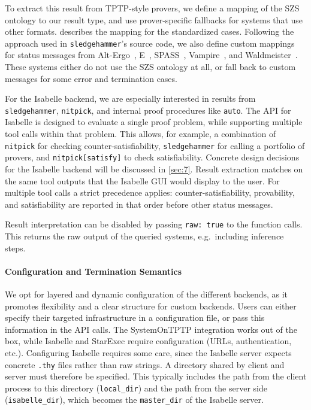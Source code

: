 \documentclass[]{ceurart}
\begin{document}
To extract this result from TPTP-style provers, we define a mapping of the SZS ontology to our result type, and use prover-specific fallbacks for systems that use other formats.  describes the mapping for the standardized cases. Following the approach used in \texttt{sledgehammer}'s source code, we also define custom mappings for status messages from Alt-Ergo~\cite{conchon2018altergo}, E~\cite{schulz2019e}, SPASS~\cite{weidenbach2009spass}, Vampire~\cite{kovacs2013first}, and Waldmeister~\cite{hillenbrand1997waldmeister}. These systems either do not use the SZS ontology at all, or fall back to custom messages for some error and termination cases.

For the Isabelle backend, we are especially interested in results from \texttt{sledgehammer}, \texttt{nitpick}, and internal proof procedures like \texttt{auto}. The API for Isabelle is designed to evaluate a single proof problem, while supporting multiple tool calls within that problem. This allows, for example, a combination of \texttt{nitpick} for checking counter-satisfiability, \texttt{sledgehammer} for calling a portfolio of provers, and \texttt{nitpick[satisfy]} to check satisfiability. Concrete design decisions for the Isabelle backend will be discussed in \cref{sec:7}. Result extraction matches on the same tool outputs that the Isabelle GUI would display to the user. For multiple tool calls a strict precedence applies: counter-satisfiability, provability, and satisfiability are reported in that order before other status messages.

Result interpretation can be disabled by passing \texttt{raw: true} to the function calls. This returns the raw output of the queried systems, e.g.\ including inference steps.

\paragraph{Configuration and Termination Semantics}

We opt for layered and dynamic configuration of the different backends, as it promotes flexibility and a clear structure for custom backends. Users can either specify their targeted infrastructure in a configuration file, or pass this information in the API calls. The SystemOnTPTP integration works out of the box, while Isabelle and StarExec require configuration (URLs, authentication, etc.). Configuring Isabelle requires some care, since the Isabelle server expects concrete \texttt{.thy} files rather than raw strings. A directory shared by client and server must therefore be specified. This typically includes the path from the client process to this directory (\texttt{local\_dir}) and the path from the server side (\texttt{isabelle\_dir}), which becomes the \texttt{master\_dir} of the Isabelle server.
\end{document}
